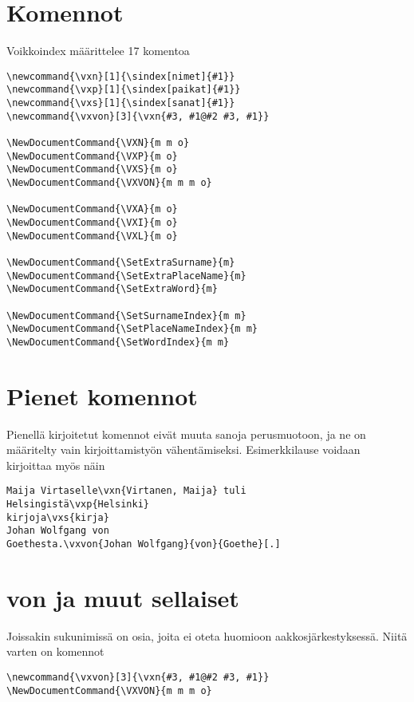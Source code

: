 \documentclass[12pt]{article}
\begin{document}
\section*{Komennot}

Voikkoindex määrittelee 17 komentoa

\begin{verbatim}
\newcommand{\vxn}[1]{\sindex[nimet]{#1}}
\newcommand{\vxp}[1]{\sindex[paikat]{#1}}
\newcommand{\vxs}[1]{\sindex[sanat]{#1}}
\newcommand{\vxvon}[3]{\vxn{#3, #1@#2 #3, #1}}

\NewDocumentCommand{\VXN}{m m o}
\NewDocumentCommand{\VXP}{m o}
\NewDocumentCommand{\VXS}{m o}
\NewDocumentCommand{\VXVON}{m m m o}

\NewDocumentCommand{\VXA}{m o}
\NewDocumentCommand{\VXI}{m o}
\NewDocumentCommand{\VXL}{m o}

\NewDocumentCommand{\SetExtraSurname}{m}
\NewDocumentCommand{\SetExtraPlaceName}{m}
\NewDocumentCommand{\SetExtraWord}{m}

\NewDocumentCommand{\SetSurnameIndex}{m m}
\NewDocumentCommand{\SetPlaceNameIndex}{m m}
\NewDocumentCommand{\SetWordIndex}{m m}
\end{verbatim}


\section*{Pienet komennot}

Pienellä kirjoitetut komennot eivät muuta sanoja perusmuotoon, ja ne
on määritelty vain kirjoittamistyön vähentämiseksi. Esimerkkilause
voidaan kirjoittaa myös näin

\begin{verbatim}
Maija Virtaselle\vxn{Virtanen, Maija} tuli
Helsingistä\vxp{Helsinki}
kirjoja\vxs{kirja}
Johan Wolfgang von
Goethesta.\vxvon{Johan Wolfgang}{von}{Goethe}[.]
\end{verbatim}


\section*{von ja muut sellaiset}

Joissakin sukunimissä on osia, joita ei oteta huomioon
aakkosjärkestyksessä. Niitä varten on komennot

\begin{verbatim}
\newcommand{\vxvon}[3]{\vxn{#3, #1@#2 #3, #1}}
\NewDocumentCommand{\VXVON}{m m m o}
\end{verbatim}
\end{document}
